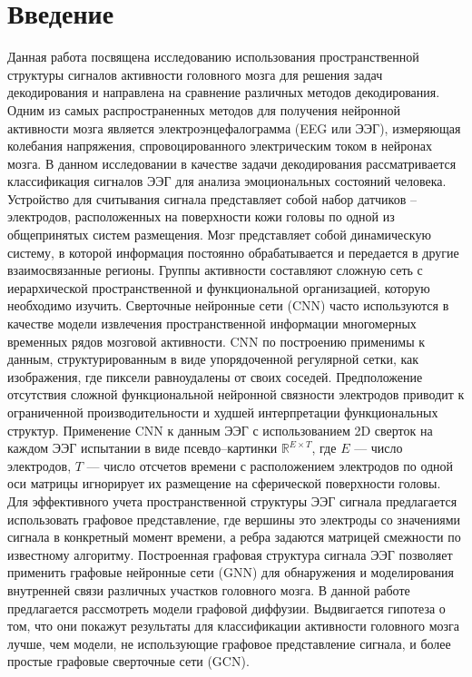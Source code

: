 \documentclass{article}
\begin{document}
\section{Введение}
Данная работа посвящена исследованию использования пространственной структуры сигналов активности головного мозга для решения задач декодирования и направлена на сравнение различных методов декодирования. Одним из самых распространенных методов для получения нейронной активности мозга является электроэнцефалограмма (EEG или ЭЭГ), измеряющая колебания
напряжения, спровоцированного электрическим током в нейронах мозга. В данном исследовании в качестве задачи декодирования рассматривается классификация сигналов ЭЭГ для анализа эмоциональных состояний человека. Устройство для считывания сигнала представляет собой
набор датчиков – электродов, расположенных на поверхности кожи головы по одной
из общепринятых систем размещения. Мозг представляет собой динамическую систему, в которой информация постоянно обрабатывается и передается в другие взаимосвязанные регионы. Группы
активности составляют сложную сеть с иерархической пространственной и функциональной организацией, которую необходимо изучить. Сверточные нейронные
сети (CNN) часто используются в качестве модели извлечения пространственной информации многомерных временных рядов мозговой активности. CNN по построению применимы к
данным, структурированным в виде упорядоченной регулярной сетки, как изображения, где пиксели равноудалены от своих соседей. Предположение отсутствия сложной
функциональной нейронной связности электродов приводит к ограниченной производительности и худшей интерпретации функциональных структур. Применение CNN
к данным ЭЭГ с использованием 2D сверток на каждом ЭЭГ испытании в виде псевдо–картинки $\mathbb{R}^{E\times T}$, где $E$ — число
электродов, $T$ — число отсчетов времени с расположением электродов по одной оси матрицы игнорирует их размещение на сферической поверхности головы. Для эффективного учета пространственной структуры ЭЭГ сигнала предлагается использовать графовое представление, где вершины это электроды со значениями
сигнала в конкретный момент времени, а ребра задаются матрицей смежности по известному алгоритму. Построенная графовая структура сигнала ЭЭГ позволяет применить графовые
нейронные сети (GNN) для обнаружения и моделирования внутренней связи
различных участков головного мозга. В данной работе предлагается рассмотреть модели графовой диффузии. Выдвигается гипотеза о том, что они покажут результаты для классификации активности головного мозга лучше, чем модели, не использующие графовое представление сигнала, и более простые графовые сверточные сети (GCN).

%
\end{document}
